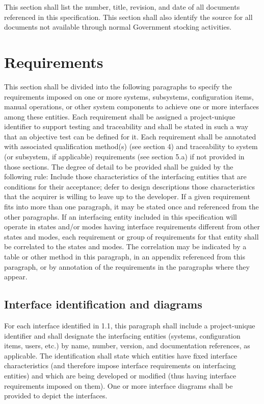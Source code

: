 \documentclass{fidata-report-template}
\begin{document}
This section shall list the number, title, revision, and date of all
documents referenced in this specification. This section shall also
identify the source for all documents not available through normal
Government stocking activities.

\section{Requirements}

This section shall be divided into the following paragraphs to specify
the requirements imposed on one or more systems, subsystems,
configuration items, manual operations, or other system components to
achieve one or more interfaces among these entities. Each requirement
shall be assigned a project-unique identifier to support testing and
traceability and shall be stated in such a way that an objective test
can be defined for it. Each requirement shall be annotated with
associated qualification method(s) (see section 4) and traceability to
system (or subsystem, if applicable) requirements (see section 5.a) if
not provided in those sections. The degree of detail to be provided
shall be guided by the following rule: Include those characteristics of
the interfacing entities that are conditions for their acceptance; defer
to design descriptions those characteristics that the acquirer is
willing to leave up to the developer. If a given requirement fits into
more than one paragraph, it may be stated once and referenced from the
other paragraphs. If an interfacing entity included in this
specification will operate in states and/or modes having interface
requirements different from other states and modes, each requirement or
group of requirements for that entity shall be correlated to the states
and modes. The correlation may be indicated by a table or other method
in this paragraph, in an appendix referenced from this paragraph, or by
annotation of the requirements in the paragraphs where they appear.

\subsection{Interface identification and diagrams}

For each interface identified in 1.1, this paragraph shall include a
project-unique identifier and shall designate the interfacing entities
(systems, configuration items, users, etc.) by name, number, version,
and documentation references, as applicable. The identification shall
state which entities have fixed interface characteristics (and therefore
impose interface requirements on interfacing entities) and which are
being developed or modified (thus having interface requirements imposed
on them). One or more interface diagrams shall be provided to depict the
interfaces.
\end{document}

